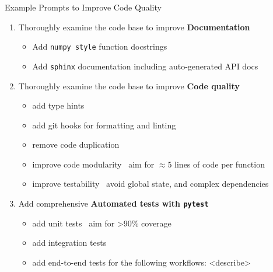 \documentclass[
  aspectratio=1610,
]{beamer}
\newcommand{\tool}[1]{\texttt{#1}}
\begin{document}
\begin{frame}
  {Example Prompts to Improve Code Quality}
  \large
  \begin{enumerate}[label=\arabic*.]
    \item Thoroughly examine the code base to improve \textbf{Documentation}
          \begin{itemize}
            \item Add \tool{numpy style} function docstrings
            \item Add \tool{sphinx} documentation including auto-generated API docs
          \end{itemize}
    \item Thoroughly examine the code base to improve \textbf{Code quality}
          \begin{itemize}
            \item add type hints
            \item add git hooks for formatting and linting
            \item remove code duplication
            \item improve code modularity \textrightarrow~aim for $\approx 5$ lines of code per function
            \item improve testability \textrightarrow~avoid global state, and complex dependencies
          \end{itemize}
    \item Add comprehensive \textbf{Automated tests with \tool{pytest}}
          \begin{itemize}
            \item add unit tests \textrightarrow~aim for >90\% coverage
            \item add integration tests
            \item add end-to-end tests for the following workflows: <describe>
          \end{itemize}
  \end{enumerate}
\end{frame}
\end{document}
